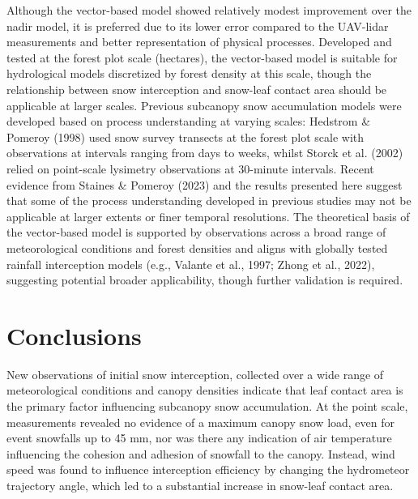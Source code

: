 \documentclass[
  letterpaper,
  DIV=11,
  numbers=noendperiod]{scrartcl}
\begin{document}
Although the vector-based model showed relatively modest improvement
over the nadir model, it is preferred due to its lower error compared to
the UAV-lidar measurements and better representation of physical
processes. Developed and tested at the forest plot scale (hectares), the
vector-based model is suitable for hydrological models discretized by
forest density at this scale, though the relationship between snow
interception and snow-leaf contact area should be applicable at larger
scales. Previous subcanopy snow accumulation models were developed based
on process understanding at varying scales: Hedstrom \& Pomeroy (1998)
used snow survey transects at the forest plot scale with observations at
intervals ranging from days to weeks, whilst Storck et al. (2002) relied
on point-scale lysimetry observations at 30-minute intervals. Recent
evidence from Staines \& Pomeroy (2023) and the results presented here
suggest that some of the process understanding developed in previous
studies may not be applicable at larger extents or finer temporal
resolutions. The theoretical basis of the vector-based model is
supported by observations across a broad range of meteorological
conditions and forest densities and aligns with globally tested rainfall
interception models (e.g., Valante et al., 1997; Zhong et al., 2022),
suggesting potential broader applicability, though further validation is
required.

\section{Conclusions}\label{conclusions}

New observations of initial snow interception, collected over a wide
range of meteorological conditions and canopy densities indicate that
leaf contact area is the primary factor influencing subcanopy snow
accumulation. At the point scale, measurements revealed no evidence of a
maximum canopy snow load, even for event snowfalls up to 45 mm, nor was
there any indication of air temperature influencing the cohesion and
adhesion of snowfall to the canopy. Instead, wind speed was found to
influence interception efficiency by changing the hydrometeor trajectory
angle, which led to a substantial increase in snow-leaf contact area.
\end{document}
